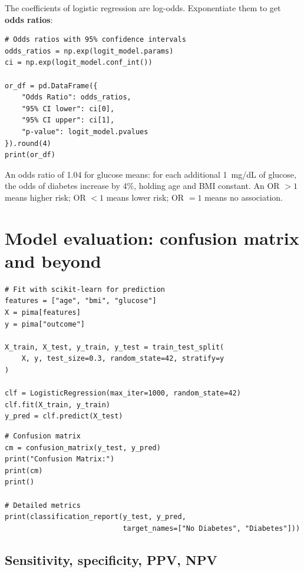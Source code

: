 The coefficients of logistic regression are log-odds. Exponentiate them to get \textbf{odds ratios}:

\begin{verbatim}
# Odds ratios with 95% confidence intervals
odds_ratios = np.exp(logit_model.params)
ci = np.exp(logit_model.conf_int())

or_df = pd.DataFrame({
    "Odds Ratio": odds_ratios,
    "95% CI lower": ci[0],
    "95% CI upper": ci[1],
    "p-value": logit_model.pvalues
}).round(4)
print(or_df)
\end{verbatim}

\begin{clinicalnote}
An odds ratio of 1.04 for glucose means: for each additional 1~mg/dL of glucose, the odds of diabetes increase by 4\%, holding age and BMI constant. An OR $> 1$ means higher risk; OR $< 1$ means lower risk; OR $= 1$ means no association.
\end{clinicalnote}

\section{Model evaluation: confusion matrix and beyond}

\begin{verbatim}
# Fit with scikit-learn for prediction
features = ["age", "bmi", "glucose"]
X = pima[features]
y = pima["outcome"]

X_train, X_test, y_train, y_test = train_test_split(
    X, y, test_size=0.3, random_state=42, stratify=y
)

clf = LogisticRegression(max_iter=1000, random_state=42)
clf.fit(X_train, y_train)
y_pred = clf.predict(X_test)
\end{verbatim}

\begin{verbatim}
# Confusion matrix
cm = confusion_matrix(y_test, y_pred)
print("Confusion Matrix:")
print(cm)
print()

# Detailed metrics
print(classification_report(y_test, y_pred,
                            target_names=["No Diabetes", "Diabetes"]))
\end{verbatim}

\subsection{Sensitivity, specificity, PPV, NPV}

